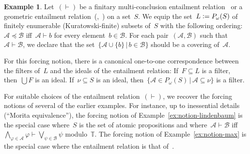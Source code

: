 \documentclass[com,11pt,crcready]{iosart2x}
\theoremstyle{definition}
\newtheorem{example}[definition]{Example}
\theoremstyle{plain}
\theoremstyle{remark}
\newcommand{\?}{\,{:}\,}
\newcommand{\TT}{\mathbb{T}}
\newcommand{\defeq}{\vcentcolon=}
\renewcommand{\_}{\mathpunct{.}\,}
\begin{document}
\begin{example}\label{ex:notion-entrel}Let~$({\vdash})$ be a finitary
multi-conclusion entailment
relation~\cite{lorenzen:investigations,neuwirth:investigations,cederquist-coquand:entdistr,scott:com,rin:edde:full,rinaldi-wessel:cut}
or a geometric entailment relation~(\cite[Section~3]{schuster-wessel:krull},~\cite{wessel:points}) on a set~$S$.
We equip the set~$L \defeq P_\omega(S)$ of
finitely enumerable (Kuratowski-finite) subsets of~$S$ with the following
ordering: $\mathcal{A} \preccurlyeq \mathcal{B}$ iff~$\mathcal{A} \vdash b$ for every
element~$b \in \mathcal{B}$. For each pair~$(\mathcal{A},\mathcal{B})$ such
that~$\mathcal{A} \vdash \mathcal{B}$, we declare that the set~$\{ \mathcal{A}
\cup \{ b \} \,|\, b \in \mathcal{B} \}$ should be a covering of~$\mathcal{A}$.

For this forcing notion, there is a canonical one-to-one correspondence between
the filters of~$L$ and the ideals of the entailment relation: If~$F \subseteq
L$ is a filter, then~$\bigcup F$ is an ideal. If~$\nu \subseteq S$ is an ideal,
then~$\{ \mathcal{A} \in P_\omega(S) \,|\, \mathcal{A} \subseteq \nu \}$ is a
filter.

For suitable choices of the entailment relation~$({\vdash})$, we recover the
forcing notions of several of the earlier examples. For instance, up to
inessential details (``Morita equivalence''), the forcing notion of
Example~\ref{ex:notion-lindenbaum} is the special case where~$S$ is the set of
atomic propositions and where~$\mathcal{A} \vdash \mathcal{B}$
iff~$\bigwedge_{\varphi \in \mathcal{A}} \varphi \vdash \bigvee_{\psi \in
\mathcal{B}} \psi$ modulo~$\TT$. The forcing notion of Example~\ref{ex:notion-max} is the
special case where the entailment relation is that
of~\cite[p.~87]{schuster-wessel:krull}.
\end{example}
\end{document}
